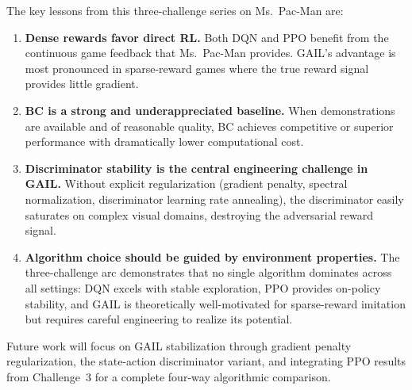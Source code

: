 \documentclass[conference]{IEEEtran}
\begin{document}
The key lessons from this three-challenge series on Ms.\ Pac-Man are:
\begin{enumerate}
  \item \textbf{Dense rewards favor direct RL.} Both DQN and PPO benefit from the
        continuous game feedback that Ms.\ Pac-Man provides.
        GAIL's advantage is most pronounced in sparse-reward games where the true reward
        signal provides little gradient.
  \item \textbf{BC is a strong and underappreciated baseline.} When demonstrations
        are available and of reasonable quality, BC achieves competitive or superior
        performance with dramatically lower computational cost.
  \item \textbf{Discriminator stability is the central engineering challenge in GAIL.}
        Without explicit regularization (gradient penalty, spectral normalization,
        discriminator learning rate annealing), the discriminator easily saturates on
        complex visual domains, destroying the adversarial reward signal.
  \item \textbf{Algorithm choice should be guided by environment properties.} The
        three-challenge arc demonstrates that no single algorithm dominates across all
        settings: DQN excels with stable exploration, PPO provides on-policy stability,
        and GAIL is theoretically well-motivated for sparse-reward imitation but requires
        careful engineering to realize its potential.
\end{enumerate}

Future work will focus on GAIL stabilization through gradient penalty regularization,
the state-action discriminator variant, and integrating PPO results from Challenge~3
for a complete four-way algorithmic comparison.
\end{document}

